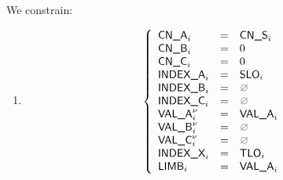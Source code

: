 \begin{center}
\end{center}

We constrain:
\begin{enumerate}
	\item 
\[
	\left\{ \begin{array}{lclr}
		\cnA      _{i}       & = & \cnS_{i}     \\
		\cnB      _{i}       & = & 0            \\
		\cnC      _{i}       & = & 0            \\
		\indexA   _{i}       & = & \slo_{i}     \\
		\indexB   _{i}       & = & \nothing     \\
		\indexC   _{i}       & = & \nothing     \\
		\valA     _{i}\new{} & = & \valA_{i}    \\
		\valB     _{i}\new{} & = & \nothing     \\
		\valC     _{i}\new{} & = & \nothing     \\
		\indexX   _{i}       & = & \tlo_{i}     \\
		\limb     _{i}       & = & \valA_{i}    \\
	\end{array} \right.
\]
\end{enumerate}
